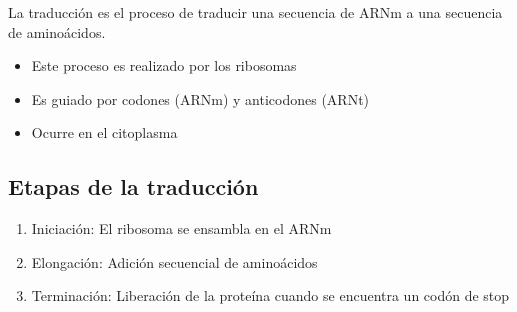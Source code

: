 La traducción es el proceso de traducir una secuencia de ARNm a una secuencia de aminoácidos.
\begin{itemize}
    \item Este proceso es realizado por los ribosomas
    \item Es guiado por codones (ARNm) y anticodones (ARNt)
    \item Ocurre en el citoplasma
\end{itemize}

\subsection{Etapas de la traducción}
\begin{enumerate}
    \item Iniciación: El ribosoma se ensambla en el ARNm
    \item Elongación: Adición secuencial de aminoácidos
    \item Terminación: Liberación de la proteína cuando se encuentra un codón de stop
\end{enumerate}